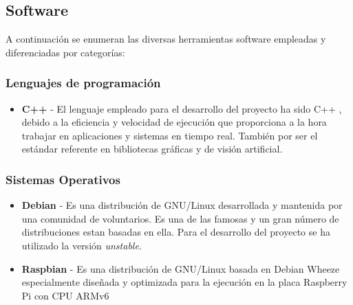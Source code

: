 \subsection{Software}
A continuación se enumeran las diversas herramientas software empleadas y diferenciadas por categorías:

\subsubsection{Lenguajes de programación}
\begin{itemize}
\item \textbf{C++} - El lenguaje empleado para el desarrollo del proyecto ha sido C++ \cite{Stroustrup00}, debido a la eficiencia y velocidad de ejecución que proporciona a la hora trabajar en aplicaciones y sistemas en tiempo real. También por ser el estándar referente en bibliotecas gráficas y de visión artificial.
\end{itemize}

\subsubsection{Sistemas Operativos}
\begin{itemize}
\item \textbf{Debian} - Es una distribución de GNU/Linux desarrollada y mantenida por una comunidad de voluntarios. Es una de las famosas y un gran número de distribuciones estan basadas en ella. Para el desarrollo del proyecto se ha utilizado la versión \emph{unstable}. 

\item \textbf{Raspbian} - Es una distribución de GNU/Linux basada en Debian Wheeze especialmente diseñada y optimizada para la ejecución en la placa Raspberry Pi con  CPU ARMv6   
\end{itemize}

